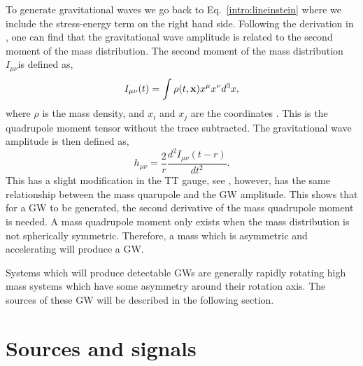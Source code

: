 To generate gravitational waves we go back to Eq.~\ref{intro:lineinstein} where we include the stress-energy term on the right hand side.
Following the derivation in \citep{Flanagan2005TheTheory}, one can find that the gravitational wave amplitude is related to the second moment of the mass distribution.
The second moment of the mass distribution $I_{\mu\nu}$is defined as,
\begin{equation}
    I_{\mu \nu}(t) = \int \rho(t,{\bf x}) x^\mu x^\nu d^3x,
\end{equation}
where $\rho$ is the mass density, and $x_i$ and $x_j$ are the coordinates \citep{Flanagan2005TheTheory}. 
This is the quadrupole moment tensor without the trace subtracted.
The gravitational wave amplitude is then defined as,
\begin{equation}
\label{intro:gravwave:amp}
    h_{\mu \nu} = \frac{2}{r}  \frac{d^2 I_{\mu \nu}(t-r)}{dt^2}.
\end{equation}
This has a slight modification in the TT gauge, see \citep{Flanagan2005TheTheory}, however, has the same relationship between the mass quarupole and the \ac{GW} amplitude.
This shows that for a \ac{GW} to be generated, the second derivative of the mass quadrupole moment is needed.
A mass quadrupole moment only exists when the mass distribution is not spherically symmetric.
Therefore, a mass which is asymmetric and accelerating will produce a \ac{GW}.

Systems which will produce detectable \acp{GW} are generally rapidly rotating high mass systems which have some asymmetry around their rotation axis.
The sources of these \ac{GW} will be described in the following section.



\section{\label{intro:sources}Sources and signals}

